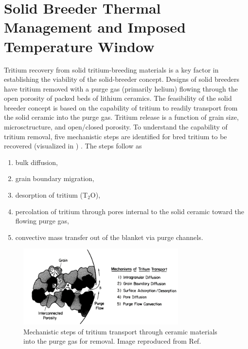 \section{Solid Breeder Thermal Management and Imposed Temperature Window}

Tritium recovery from solid tritium-breeding materials is a key factor in establishing the viability of the solid-breeder concept. Designs of solid breeders have tritium removed with a purge gas (primarily helium) flowing through the open porosity of packed beds of lithium ceramics. The feasibility of the solid breeder concept is based on the capability of tritium to readily transport from the solid ceramic into the purge gas. Tritium release is a function of grain size, microsctructure, and open/closed porosity. To understand the capability of tritium removal, five mechanistic steps are identified for bred tritium to be recovered (visualized in ) . The steps follow as\cite{Clemmer1980}
\begin{enumerate}
\item bulk diffusion,
\item grain boundary migration,
\item desorption of tritium (T$_2$O),
\item percolation of tritium through pores internal to the solid ceramic toward the flowing purge gas,
\item convective mass transfer out of the blanket via purge channels.
\end{enumerate}

\begin{figure}[ht]
	\centering
	\includegraphics[width=0.75\textwidth]{figures/mechanisms_tritium_transport} 
	\caption{Mechanistic steps of tritium transport through ceramic materials into the purge gas for removal. Image reproduced from Ref.\cite{hastings1989fabrication}}
	\label{fig:mechanisms_tritium_transport}
\end{figure}

